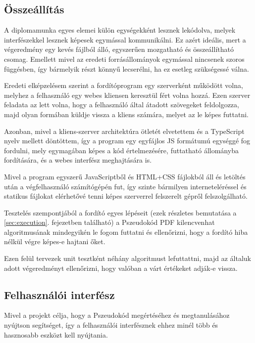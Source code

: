 \subsection{Összeállítás}

A diplomamunka egyes elemei külön egységekként lesznek lekódolva, melyek interfészekkel lesznek képesek egymással kommunikálni. Ez azért ideális, mert a végeredmény egy kevés fájlból álló, egyszerűen mozgatható és összeállítható csomag. Emellett mivel az eredeti forrásállományok egymással nincsenek szoros függésben, így  bármelyik részt könnyű lecserélni, ha ez esetleg szükségessé válna.

Eredeti elképzelésem szerint a fordítóprogram egy szerverként működött volna, melyhez a felhasználó egy webes kliensen keresztül fért volna hozzá. Ezen szerver feladata az lett volna, hogy a felhasználó által átadott szövegeket feldolgozza, majd olyan formában küldje vissza a kliens számára, melyet az le képes futtatni.

Azonban, mivel a kliens-szerver architektúra ötletét elvetettem és a TypeScript nyelv mellett döntöttem, így a program egy egyfájlos JS formátumú egységgé fog fordulni, mely egymagában képes a kód értelmezésére, futtatható állományba fordítására, és a webes interfész meghajtására is.

Mivel a program egyszerű JavaScriptből és HTML+CSS fájlokból áll és letöltés után a végfelhasználó számítógépén fut, így szinte bármilyen interneteléréssel és statikus fájlokat elérhetővé tenni képes szerverrel felszerelt gépről felszolgálható.

Tesztelés szempontjából a fordító egyes lépéseit (ezek részletes bemutatása a \ref{sec:execution}. fejezetben található) a Pszeudokód PDF kilencvenhat algoritmusának mindegyikén le fogom futtatni és ellenőrizni, hogy a fordító hiba nélkül végre képes-e hajtani őket.

Ezen felül tervezek unit tesztként néhány algoritmust lefuttattni, majd az általuk adott végeredményt ellenőrizni, hogy valóban a várt értékeket adják-e vissza.

\subsection{Felhasználói interfész}

Mivel a projekt célja, hogy a Pszeudokód megértéséhez és megtanulásához nyújtson segítséget, így a felhasználói interfésznek ehhez minél több és hasznosabb eszközt kell nyújtania.

